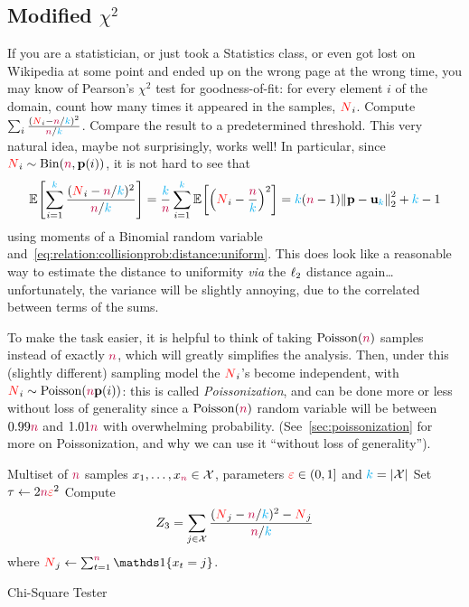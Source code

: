 \subsection{Modified $\chi^2$} If you are a statistician, or just took a Statistics class, or even got lost on Wikipedia at some point and ended up on the wrong page at the wrong time, you may know of Pearson's $\chi^2$ test for goodness-of-fit: for every element $i$ of the domain, count how many times it appeared in the samples, $\occur_i$. Compute $\sum_{i} \frac{(\occur_i-\ns/\ab)^2}{\ns/\ab}$. Compare the result to a predetermined threshold. This very natural idea, maybe not surprisingly, works well! In particular, since $\occur_i \sim \binomial{\ns}{\p(i)}$, it is not hard to see that
\[
\bEE{ \sum_{i=1}^\ab \frac{(\occur_i-\ns/\ab)^2}{\ns/\ab} } = \frac{\ab}{\ns}\sum_{i=1}^\ab \bEE{ \Paren{\occur_i-\frac{\ns}{\ab}}^2 } = \ab(\ns-1)\normtwo{\p-\uniform_\ab}^2 + \ab-1
\]
using moments of a Binomial random variable and~\cref{eq:relation:collisionprob:distance:uniform}. This does look like a reasonable way to estimate the distance to uniformity \emph{via} the $\lp[2]$ distance again\dots{} unfortunately, the variance will be slightly annoying, due to the correlated between terms of the sums.


To make the task easier, it is helpful to think of taking $\poisson{\ns}$ samples instead of exactly $\ns$, which will greatly simplifies the analysis. Then, under this (slightly different) sampling model the $\occur_i$'s become independent, with $\occur_i\sim\poisson{\ns\p(i)}$: this is called \emph{Poissonization}, and can be done more or less without loss of generality since a $\poisson{\ns}$ random variable will be between $0.99\ns$ and $1.01\ns$ with overwhelming probability. (See~\cref{sec:poissonization} for more on Poissonization, and why we can use it ``without loss of generality'').

\begin{algorithm}[ht!]
  \begin{algorithmic}[1]
    \Require Multiset of $\ns$ samples $x_1,\dots,x_\ns \in \domain$, parameters $\dst\in(0,1]$ and $\ab = \abs{\domain}$
    \State Set $\tau \gets 2\ns\dst^2$
    \State Compute 
    \[
        Z_3 = \sum_{j\in\domain} \frac{(\occur_j-\ns/\ab)^2-\occur_j}{\ns/\ab}
    \] where $\occur_j \gets \sum_{t=1}^\ns\indic{x_t=j}$.
     \Return \reject {}
    \Else\ 
      \Return \accept {}
    \EndIf
  \end{algorithmic}
  \caption{\label{algo:chisquare}\sc Chi-Square Tester}
\end{algorithm}

